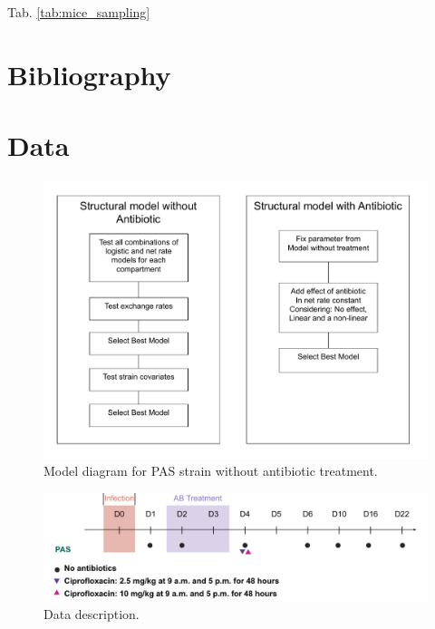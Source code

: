 \documentclass{article}
\begin{document}
Tab. \ref{tab:mice_sampling}

\section{Bibliography}

\appendix
\section{Data}


\begin{figure}
	\centering
	\includegraphics[width=0.8\linewidth]{images/anoruti_model_strategy_v002.pdf}
	\caption{Model diagram for PAS strain without antibiotic treatment. }
	\label{fig:ModelingStrategy}
\end{figure}


\begin{figure}
	\centering
	\includegraphics[width=0.8\linewidth]{images/draw_Anoruti_flowchart_PAS.pdf}
	\caption{Data description. }
\end{figure}
\end{document}

